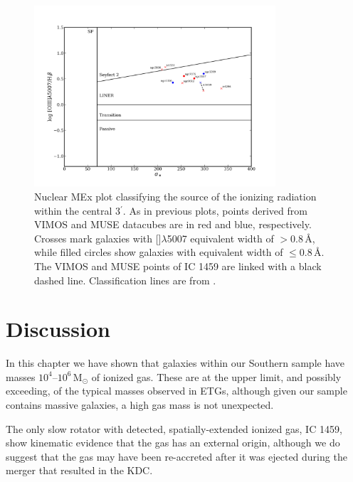 		\begin{figure}
			\centering
			\includegraphics[width=0.8\textwidth]{chapter5/nuclear_MEx.png}
			\caption[Nuclear mass--excitation plot]{Nuclear MEx plot classifying the source of the ionizing radiation within the central 3$^\prime$. As in previous plots, points derived from VIMOS and MUSE datacubes are in red and blue, respectively. Crosses mark galaxies with []$\lambda$5007 equivalent width of $> 0.8$\,\AA, while filled circles show galaxies with equivalent width of $\leqslant 0.8$\,\AA. The VIMOS and MUSE points of IC 1459 are linked with a black dashed line. Classification lines are from \citet{Nyland2016}.}
			\label{fig:MEx}
		\end{figure}


\section{Discussion}
	\label{sec:gasDiscussion}
	In this chapter we have shown that galaxies within our Southern sample have masses $10^4$--$10^6\,\mathrm{M_\odot}$ of ionized gas. These are at the upper limit, and possibly exceeding, of the typical masses observed in ETGs, although given our sample contains massive galaxies, a high gas mass is not unexpected. 


	The only slow rotator with detected, spatially-extended ionized gas, IC 1459, show kinematic evidence that the gas has an external origin, although we do suggest that the gas may have been re-accreted after it was ejected during the merger that resulted in the KDC. 

